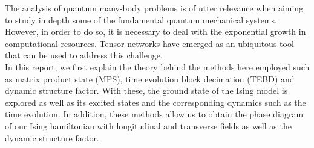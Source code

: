 
The analysis of quantum many-body problems is of utter relevance when aiming to study in depth some of the fundamental quantum mechanical systems.
However, in order to do so, it is necessary to deal with the exponential growth in computational resources.
Tensor networks have emerged as an ubiquitous tool that can be used to address this challenge.\\

In this report, we first explain the theory behind the methods here employed such as matrix product state (MPS), time evolution block decimation (TEBD) and dynamic structure factor.
With these, the ground state of the Ising model is explored as well as its excited states and the corresponding dynamics such as the time evolution.
In addition, these methods allow us to obtain the phase diagram of our Ising hamiltonian with longitudinal and transverse fields as well as the dynamic structure factor.